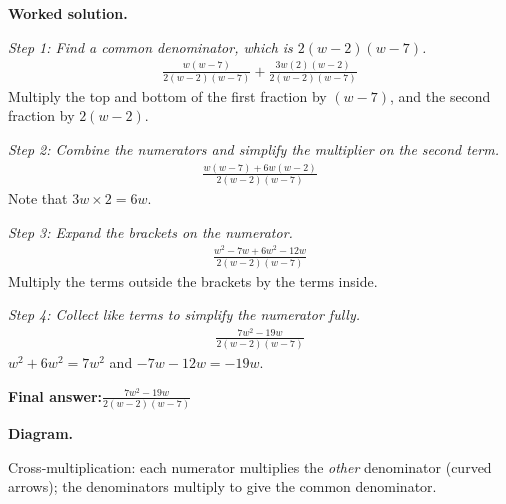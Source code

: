 \documentclass[11pt]{article}
\begin{document}
\textbf{Worked solution.}

\textit{Step 1: Find a common denominator, which is \( 2(w-2)(w-7) \).}
\[\begin{gathered}
\frac{w(w-7)}{2(w-2)(w-7)} + \frac{3w(2)(w-2)}{2(w-2)(w-7)}
\end{gathered}\]
Multiply the top and bottom of the first fraction by \( (w-7) \), and the second fraction by \( 2(w-2) \).

\textit{Step 2: Combine the numerators and simplify the multiplier on the second term.}
\[\begin{gathered}
\frac{w(w-7) + 6w(w-2)}{2(w-2)(w-7)}
\end{gathered}\]
Note that \( 3w \times 2 = 6w \).

\textit{Step 3: Expand the brackets on the numerator.}
\[\begin{gathered}
\frac{w^2 - 7w + 6w^2 - 12w}{2(w-2)(w-7)}
\end{gathered}\]
Multiply the terms outside the brackets by the terms inside.

\textit{Step 4: Collect like terms to simplify the numerator fully.}
\[\begin{gathered}
\frac{7w^2 - 19w}{2(w-2)(w-7)}
\end{gathered}\]
\( w^2 + 6w^2 = 7w^2 \) and \( -7w - 12w = -19w \).

\begin{answerbox}
\textbf{Final answer:}\quad \(\displaystyle \frac{7w^2 - 19w}{2(w-2)(w-7)}\)
\end{answerbox}
\textbf{Diagram.}

\begin{center}
\end{center}
\small Cross-multiplication: each numerator multiplies the \emph{other} denominator (curved arrows); the denominators multiply to give the common denominator.\normalsize
\end{document}
